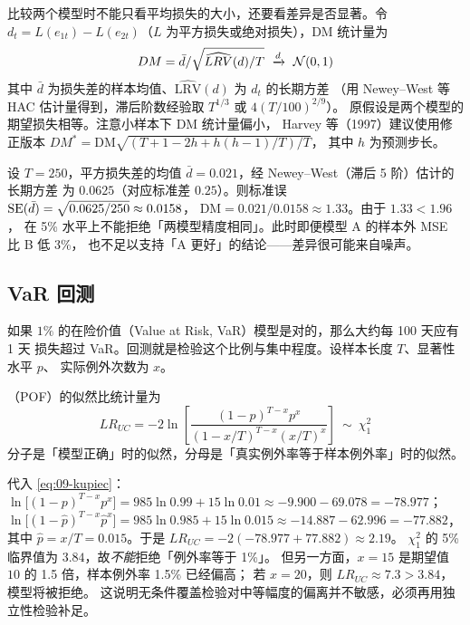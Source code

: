 比较两个模型时不能只看平均损失的大小，还要看差异是否显著。令
$d_t=L(e_{1t})-L(e_{2t})$（$L$ 为平方损失或绝对损失），DM 统计量为
\begin{equation}\label{eq:09-dm}
  DM=\bar d/\sqrt{\widehat{LRV}(d)/T}
  \ \xrightarrow{d}\ \mathcal{N}(0,1)
\end{equation}
其中 $\bar d$ 为损失差的样本均值、$\widehat{\mathrm{LRV}}(d)$ 为 $d_t$ 的长期方差
（用 Newey--West 等 HAC 估计量得到，滞后阶数经验取 $T^{1/3}$ 或 $4(T/100)^{2/9}$）。
原假设是两个模型的期望损失相等。注意小样本下 DM 统计量偏小，
Harvey 等（1997）建议使用修正版本 $DM^{\ast}=\mathrm{DM}\sqrt{(T+1-2h+h(h-1)/T)/T}$，
其中 $h$ 为预测步长。

\begin{example}[DM 检验的数值判读]\label{ex:09-dm}
设 $T=250$，平方损失差的均值 $\bar d=0.021$，经 Newey--West（滞后 5 阶）估计的长期方差
为 $0.0625$（对应标准差 $0.25$）。则标准误
$\operatorname{SE}(\bar d)=\sqrt{0.0625/250}\approx 0.0158$，
$\mathrm{DM}=0.021/0.0158\approx 1.33$。由于 $1.33<1.96$，
在 5\% 水平上不能拒绝「两模型精度相同」。此时即便模型 A 的样本外 MSE 比 B 低 3\%，
也不足以支持「A 更好」的结论——差异很可能来自噪声。
\end{example}

\subsection{VaR 回测}

如果 $1\%$ 的在险价值（Value at Risk, VaR）模型是对的，那么大约每 100 天应有 1 天
损失超过 VaR。回测就是检验这个比例与集中程度。设样本长度 $T$、显著性水平 $p$、
实际例外次数为 $x$。

（POF）的似然比统计量为
\begin{equation}\label{eq:09-kupiec}
  LR_{UC}=-2\ln\!\left[
  \frac{(1-p)^{T-x}p^{x}}
       {(1-x/T)^{T-x}(x/T)^{x}}\right]\ \sim\ \chi^{2}_{1}
\end{equation}
分子是「模型正确」时的似然，分母是「真实例外率等于样本例外率」时的似然。

\begin{example}[Kupiec 检验：$T=1000$，$p=1\%$，$x=15$]\label{ex:09-kupiec}
代入 \cref{eq:09-kupiec}：
$\ln\bigl[(1-p)^{T-x}p^{x}\bigr]=985\ln 0.99+15\ln 0.01\approx -9.900-69.078=-78.977$；
$\ln\bigl[(1-\hat p)^{T-x}\hat p^{x}\bigr]=985\ln 0.985+15\ln 0.015
\approx -14.887-62.996=-77.882$，
其中 $\hat p=x/T=0.015$。于是 $LR_{UC}=-2(-78.977+77.882)\approx 2.19$。
$\chi^2_1$ 的 5\% 临界值为 $3.84$，故\emph{不能}拒绝「例外率等于 1\%」。
但另一方面，$x=15$ 是期望值 $10$ 的 1.5 倍，样本例外率 1.5\% 已经偏高；
若 $x=20$，则 $LR_{UC}\approx 7.3>3.84$，模型将被拒绝。
这说明无条件覆盖检验对中等幅度的偏离并不敏感，必须再用独立性检验补足。
\end{example}

